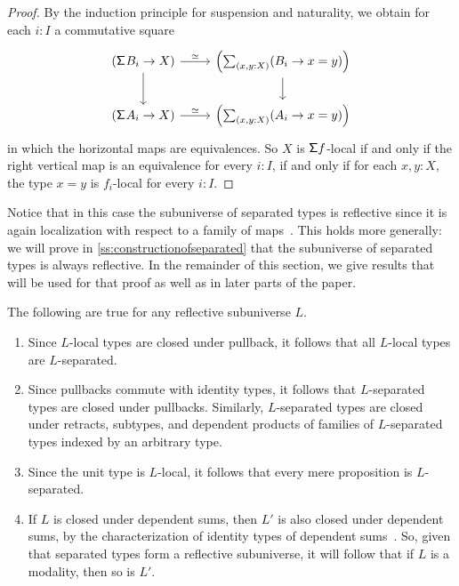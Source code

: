 \begin{proof}
    By the induction principle for suspension and naturality, we obtain for each $i : I$ a commutative square
\[
  \begin{tikzcd}
    (\susp{B_i} \to X) \arrow[r,"\simeq"] \arrow[d] & \left( \sm{x,y:X} (B_i \to x = y) \right) \arrow[d] \\
    (\susp{A_i} \to X) \arrow[r,"\simeq"] & \left( \sm{x,y:X} (A_i \to x = y) \right)
  \end{tikzcd}
\]
in which the horizontal maps are equivalences.
So $X$ is $\mathsf{\Sigma} f$-local if and only if the right vertical map is an equivalence
for every $i : I$, if and only if for each $x,y : X$, the type $x = y$ is $f_i$-local
for every $i : I$.
\end{proof}

Notice that in this case the subuniverse of separated types is reflective
since it is again localization with respect to a family of maps~\cite[Theorem~2.16]{RijkeShulmanSpitters}.
This holds more generally: we will prove in \cref{ss:constructionofseparated} that the subuniverse
of separated types is always reflective.
In the remainder of this section, we give results that will be used for that proof
as well as in later parts of the paper.

\begin{rmk}
The following are true for any reflective subuniverse $L$.
\begin{enumerate}
\item Since $L$-local types are closed under pullback, it follows that all $L$-local types are $L$-separated.
\item Since pullbacks commute with identity types, it follows that $L$-separated types are closed under pullbacks. Similarly, $L$-separated types are closed under retracts, subtypes, and dependent products of families of $L$-separated types indexed by an arbitrary type.
\item Since the unit type is $L$-local, it follows that every mere proposition is $L$-separated.
\item If $L$ is closed under dependent sums, then $L'$ is also closed under dependent sums,
    by the characterization of identity types of dependent sums~\cite[Theorem~2.7.2]{hottbook}.
    So, given that separated types form a reflective subuniverse, it will follow that if $L$ is a modality,
    then so is $L'$.
\end{enumerate}
\end{rmk}

